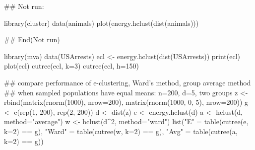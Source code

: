 \documentclass{article}
\begin{document}
\begin{Examples}
\begin{ExampleCode}
   ## Not run: 
   
   library(cluster)
   data(animals)
   plot(energy.hclust(dist(animals)))
   
## End(Not run)
   
   library(mva)
   data(USArrests)
   ecl <- energy.hclust(dist(USArrests))
   print(ecl)    
   plot(ecl)
   cutree(ecl, k=3)
   cutree(ecl, h=150)
   
   ## compare performance of e-clustering, Ward's method, group average method
   ## when sampled populations have equal means: n=200, d=5, two groups
   z <- rbind(matrix(rnorm(1000), nrow=200), matrix(rnorm(1000, 0, 5), nrow=200))
   g <- c(rep(1, 200), rep(2, 200))
   d <- dist(z)
   e <- energy.hclust(d)
   a <- hclust(d, method="average")
   w <- hclust(d^2, method="ward")
   list("E" = table(cutree(e, k=2) == g), "Ward" = table(cutree(w, k=2) == g),
        "Avg" = table(cutree(a, k=2) == g))
 \end{ExampleCode}
\end{Examples}
\end{document}
